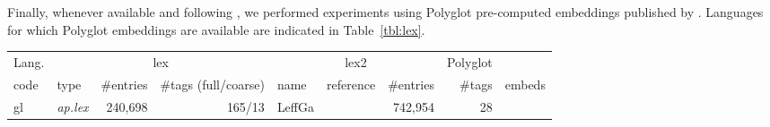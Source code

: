 \documentclass[11pt,letterpaper]{article}
\begin{document}
Finally, whenever available and following \citet{plank16}, we performed experiments using Polyglot pre-computed
embeddings published by \citet{alrfou13}. Languages for which Polyglot embeddings are available are indicated in Table~\ref{tbl:lex}.

\begin{table}
\centering
\scriptsize
\begin{tabular}{l|lrr|llrrc}
\toprule
Lang. & \multicolumn{3}{c}{\sc lex} & \multicolumn{3}{|c}{\sc lex2} & Polyglot\\
code & type & \#entries & \#tags (full/coarse) & name & reference & \#entries & \#tags & embeds\\
\midrule
gl & {\em ap.lex} & 240,698 & 165/13 & LeffGa & \citep{sagot10lefff} & 742,954 & 28 & \\

\end{tabular}
\end{table}
\end{document}
